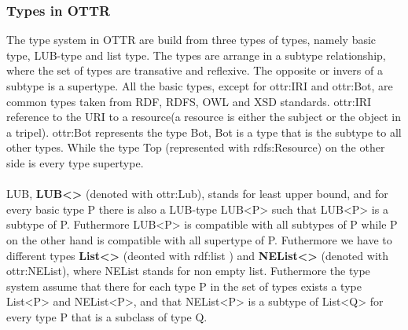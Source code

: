 \subsubsection{Types in OTTR}
The type system in OTTR are build from three types of types, namely basic type, LUB-type and list type. The types are arrange in 
a subtype relationship, where the set of types are transative and reflexive. The opposite or invers of a subtype is a supertype.
All the basic types, except for ottr:IRI and ottr:Bot, are common types taken from RDF, RDFS, OWL and XSD standards. ottr:IRI reference 
to the URI to a resource(a resource is either the subject or the object in a tripel). ottr:Bot represents the type Bot, Bot is a type that 
is the subtype to all other types. While the type Top (represented with rdfs:Resource) on the other side is every type supertype.
\\ \\
LUB, \textbf{LUB<>} (denoted with ottr:Lub), stands for least upper bound, and for every basic type P there is also a LUB-type LUB<P> such that LUB<P> is 
a subtype of P. Futhermore LUB<P> is compatible with all subtypes of P while P on the other hand is compatible with all supertype of P. 
Futhermore we have to different types \textbf{List<>} (deonted with rdf:list ) and \textbf{NEList<>} (denoted with ottr:NEList), where 
NEList stands for non empty list. Futhermore the 
type system assume that there for each type P in the set of types exists a type List<P> and NEList<P>, and that 
NEList<P> is a subtype of List<Q> for every type P that is a subclass of type Q.